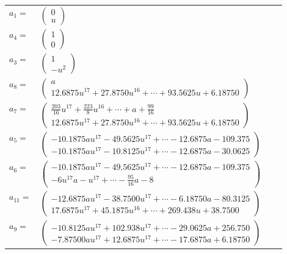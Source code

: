 \documentclass[1p]{elsarticle_modified}
\theoremstyle{definition}
\begin{document}
\begin{tabular}{m{7pt} m{180pt} m{7pt} m{180pt} }
\flushright $a_{1}=$&$\begin{pmatrix}0\\u\end{pmatrix}$ \\
\flushright $a_{4}=$&$\begin{pmatrix}1\\0\end{pmatrix}$ \\
\flushright $a_{3}=$&$\begin{pmatrix}1\\- u^2\end{pmatrix}$ \\
\flushright $a_{8}=$&$\begin{pmatrix}a\\12.6875 u^{17}+27.8750 u^{16}+\cdots+93.5625 u+6.18750\end{pmatrix}$ \\
\flushright $a_{7}=$&$\begin{pmatrix}\frac{203}{16} u^{17}+\frac{223}{8} u^{16}+\cdots+a+\frac{99}{16}\\12.6875 u^{17}+27.8750 u^{16}+\cdots+93.5625 u+6.18750\end{pmatrix}$ \\
\flushright $a_{5}=$&$\begin{pmatrix}-10.1875 a u^{17}-49.5625 u^{17}+\cdots-12.6875 a-109.375\\-10.1875 a u^{17}-10.8125 u^{17}+\cdots-12.6875 a-30.0625\end{pmatrix}$ \\
\flushright $a_{6}=$&$\begin{pmatrix}-10.1875 a u^{17}-49.5625 u^{17}+\cdots-12.6875 a-109.375\\-6 u^{17} a- u^{17}+\cdots-\frac{95}{16} a-8\end{pmatrix}$ \\
\flushright $a_{11}=$&$\begin{pmatrix}-12.6875 a u^{17}-38.7500 u^{17}+\cdots-6.18750 a-80.3125\\17.6875 u^{17}+45.1875 u^{16}+\cdots+269.438 u+38.7500\end{pmatrix}$ \\
\flushright $a_{9}=$&$\begin{pmatrix}-10.8125 a u^{17}+102.938 u^{17}+\cdots-29.0625 a+256.750\\-7.87500 a u^{17}+12.6875 u^{17}+\cdots-17.6875 a+6.18750\end{pmatrix}$ \\

\end{tabular}
\end{document}
